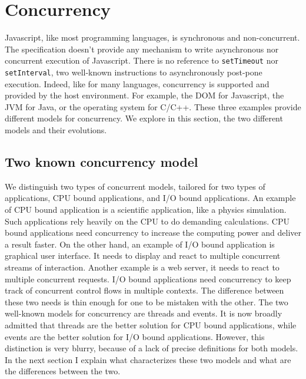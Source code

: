 \section{Concurrency}

Javascript, like most programming languages, is synchronous and non-concurrent. The specification doesn't provide any mechanism to write asynchronous nor concurrent execution of Javascript.
There is no reference to \texttt{setTimeout} nor \texttt{setInterval}, two well-known instructions to asynchronously post-pone execution.
Indeed, like for many languages, concurrency is supported and provided by the host environment.
For example, the DOM for Javascript, the JVM for Java, or the operating system for C/C++.
These three examples provide different models for concurrency.
We explore in this section, the two different models and their evolutions.

\subsection{Two known concurrency model}

We distinguish two types of concurrent models, tailored for two types of applications, CPU bound applications, and I/O bound applications.
An example of CPU bound application is a scientific application, like a physics simulation. Such applications rely heavily on the CPU to do demanding calculations.
CPU bound applications need concurrency to increase the computing power and deliver a result faster.
On the other hand, an example of I/O bound application is graphical user interface.
It needs to display and react to multiple concurrent streams of interaction.
Another example is a web server, it needs to react to multiple concurrent requests.
I/O bound applications need concurrency to keep track of concurrent control flows in multiple contexts.
The difference between these two needs is thin enough for one to be mistaken with the other.
The two well-known models for concurrency are threads and events.
It is now broadly admitted that threads are the better solution for CPU bound applications, while events are the better solution for I/O bound applications.
However, this distinction is very blurry, because of a lack of precise definitions for both models.
In the next section I explain what characterizes these two models and what are the differences between the two.


